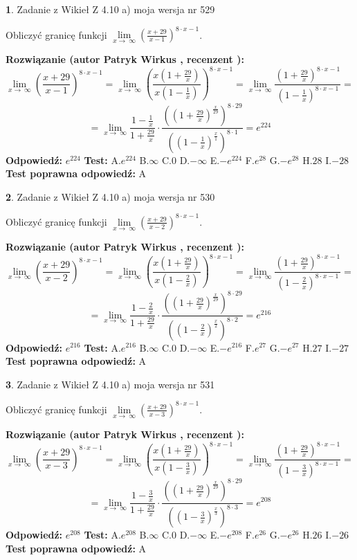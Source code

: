 \documentclass[12pt, a4paper]{article}
\theoremstyle{definition} %
\newtheorem{zad}{}
\newcommand{\zadStart}[1]{\begin{zad}#1\newline}
\newcommand{\zadStop}{\end{zad}}
\newcommand{\rozwStart}[2]{\noindent \textbf{Rozwiązanie (autor #1 , recenzent #2): }\newline}
\newcommand{\rozwStop}{\newline}
\newcommand{\odpStart}{\noindent \textbf{Odpowiedź:}\newline}
\newcommand{\odpStop}{\newline}
\newcommand{\testStart}{\noindent \textbf{Test:}\newline}
\newcommand{\testStop}{\newline}
\newcommand{\kluczStart}{\noindent \textbf{Test poprawna odpowiedź:}\newline}
\newcommand{\kluczStop}{\newline}
\begin{document}
\zadStart{Zadanie z Wikieł Z 4.10 a) moja wersja nr 529}

Obliczyć granicę funkcji  $\lim\limits_{x\to\ \infty}(\frac{x+29}{x-1})^{8\cdot x-1}$.
\zadStop
\rozwStart{Patryk Wirkus}{}
$$\lim\limits_{x\to\ \infty}(\frac{x+29}{x-1})^{8\cdot x-1} = \lim\limits_{x\to\ \infty}(\frac{x(1+\frac{29}{x})}{x(1-\frac{1}{x})})^{8\cdot x-1}=\lim\limits_{x\to\ \infty}\frac{(1+\frac{29}{x})^{8\cdot x-1}}{(1-\frac{1}{x})^{8\cdot x-1}}=$$
$$=\lim\limits_{x\to\ \infty}\frac{1-\frac{1}{x}}{1+\frac{29}{x}}\cdot\frac{((1+\frac{29}{x})^{\frac{x}{29}})^{8\cdot29}}{((1-\frac{1}{x})^{\frac{x}{1}})^{8\cdot1}}=e^{224}$$
\rozwStop
\odpStart
$e^{224}$
\odpStop
\testStart
A.$e^{224}$ B.$\infty$ C.$0$ D.$-\infty$ E.$-e^{224}$
F.$e^{28}$ G.$-e^{28}$
H.$28$
I.$-28$
\testStop
\kluczStart
A
\kluczStop



\zadStart{Zadanie z Wikieł Z 4.10 a) moja wersja nr 530}

Obliczyć granicę funkcji  $\lim\limits_{x\to\ \infty}(\frac{x+29}{x-2})^{8\cdot x-1}$.
\zadStop
\rozwStart{Patryk Wirkus}{}
$$\lim\limits_{x\to\ \infty}(\frac{x+29}{x-2})^{8\cdot x-1} = \lim\limits_{x\to\ \infty}(\frac{x(1+\frac{29}{x})}{x(1-\frac{2}{x})})^{8\cdot x-1}=\lim\limits_{x\to\ \infty}\frac{(1+\frac{29}{x})^{8\cdot x-1}}{(1-\frac{2}{x})^{8\cdot x-1}}=$$
$$=\lim\limits_{x\to\ \infty}\frac{1-\frac{2}{x}}{1+\frac{29}{x}}\cdot\frac{((1+\frac{29}{x})^{\frac{x}{29}})^{8\cdot29}}{((1-\frac{2}{x})^{\frac{x}{2}})^{8\cdot2}}=e^{216}$$
\rozwStop
\odpStart
$e^{216}$
\odpStop
\testStart
A.$e^{216}$ B.$\infty$ C.$0$ D.$-\infty$ E.$-e^{216}$
F.$e^{27}$ G.$-e^{27}$
H.$27$
I.$-27$
\testStop
\kluczStart
A
\kluczStop



\zadStart{Zadanie z Wikieł Z 4.10 a) moja wersja nr 531}

Obliczyć granicę funkcji  $\lim\limits_{x\to\ \infty}(\frac{x+29}{x-3})^{8\cdot x-1}$.
\zadStop
\rozwStart{Patryk Wirkus}{}
$$\lim\limits_{x\to\ \infty}(\frac{x+29}{x-3})^{8\cdot x-1} = \lim\limits_{x\to\ \infty}(\frac{x(1+\frac{29}{x})}{x(1-\frac{3}{x})})^{8\cdot x-1}=\lim\limits_{x\to\ \infty}\frac{(1+\frac{29}{x})^{8\cdot x-1}}{(1-\frac{3}{x})^{8\cdot x-1}}=$$
$$=\lim\limits_{x\to\ \infty}\frac{1-\frac{3}{x}}{1+\frac{29}{x}}\cdot\frac{((1+\frac{29}{x})^{\frac{x}{29}})^{8\cdot29}}{((1-\frac{3}{x})^{\frac{x}{3}})^{8\cdot3}}=e^{208}$$
\rozwStop
\odpStart
$e^{208}$
\odpStop
\testStart
A.$e^{208}$ B.$\infty$ C.$0$ D.$-\infty$ E.$-e^{208}$
F.$e^{26}$ G.$-e^{26}$
H.$26$
I.$-26$
\testStop
\kluczStart
A
\kluczStop
\end{document}
